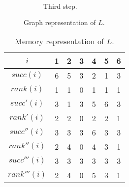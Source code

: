 \begin{figure} [t]
\begin{subfigure}{\linewidth}
    \label{fig:list2}
  \end{subfigure} \vspace{1em} \\
  \begin{subfigure}{\linewidth}
    \centering
    \caption{Third step.}
    \label{fig:list3}
  \end{subfigure}
  \caption{Graph representation of $L$.}
  \label{fig:list}
\end{figure}
%
\begin{table}[t]
  \centering
  \begin{tabular}{c|cccccc}
    $i$          & 1 & 2 & 3 & 4 & 5 & 6 \\ \hline\hline
    $succ(i)$    & 6 & 5 & 3 & 2 & 1 & 3 \\
    $rank(i)$    & 1 & 1 & 0 & 1 & 1 & 1 \\ \hline
    $succ'(i)$   & 3 & 1 & 3 & 5 & 6 & 3 \\
    $rank'(i)$   & 2 & 2 & 0 & 2 & 2 & 1 \\ \hline
    $succ''(i)$  & 3 & 3 & 3 & 6 & 3 & 3 \\
    $rank''(i)$  & 2 & 4 & 0 & 4 & 3 & 1 \\ \hline
    $succ'''(i)$ & 3 & 3 & 3 & 3 & 3 & 3 \\
    $rank'''(i)$ & 2 & 4 & 0 & 5 & 3 & 1 \\ \hline
  \end{tabular}
  \caption{Memory representation of $L$.}
  \label{tab:list}
\end{table}
